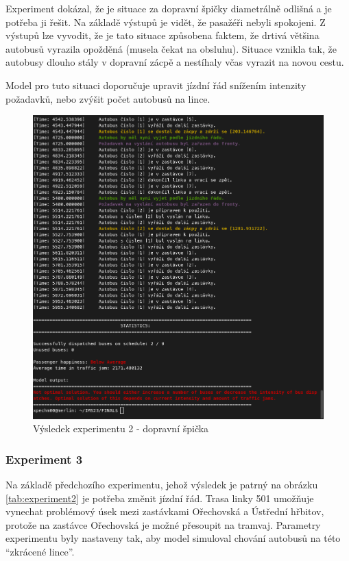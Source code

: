 \documentclass[a4paper]{article}
\begin{document}
				Experiment dokázal, že je situace za dopravní špičky diametrálně odlišná a je potřeba ji řešit. Na základě výstupů je vidět, že pasažéři nebyli spokojeni. Z výstupů lze vyvodit, že je tato situace způsobena faktem, že drtivá většina autobusů vyrazila opožděná (musela čekat na obsluhu). Situace vznikla tak, že autobusy dlouho stály v dopravní zácpě a nestíhaly včas vyrazit na novou cestu.
                
                Model pro tuto situaci doporučuje upravit jízdní řád snížením intenzity požadavků, nebo zvýšit počet autobusů na lince.

                \begin{figure}[H]
                \includegraphics[scale=0.48, keepaspectratio]{fig/ims_bus2.png}
                \caption{Výsledek experimentu 2 - dopravní špička}
                \label{fig:experiment2}
            \end{figure}
    \newpage
            \subsubsection{Experiment 3}
            \label{subsubsec:experiment3}

				Na základě předchozího experimentu, jehož výsledek je patrný na obrázku \ref{tab:experiment2} je potřeba změnit jízdní řád. Trasa linky 501 umožňuje vynechat problémový úsek mezi zastávkami Ořechovská a Ústřední hřbitov, protože na zastávce Ořechovská je možné přesoupit na tramvaj. Parametry experimentu byly nastaveny tak, aby model simuloval chování autobusů na této \enquote{zkrácené lince}.
                
\end{document}
